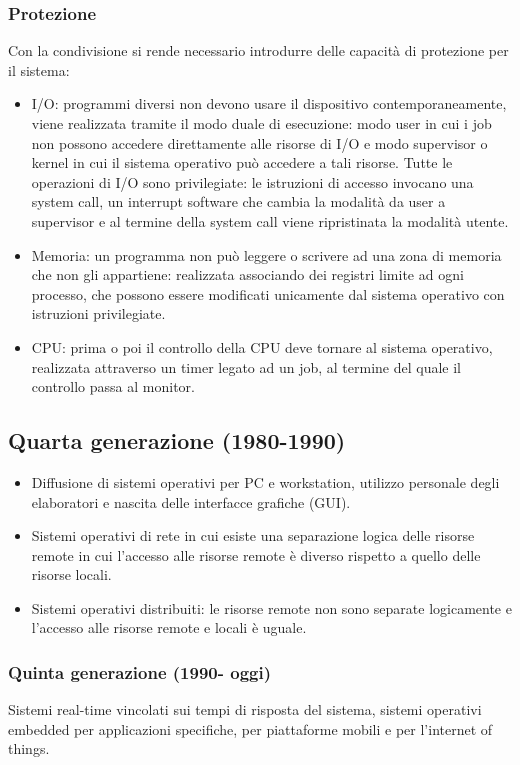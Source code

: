 \subsubsection{Protezione}
Con la condivisione si rende necessario introdurre delle capacit\`a di protezione per il sistema:
\begin{itemize}
	\item I/O: programmi diversi non devono usare il dispositivo contemporaneamente, viene realizzata tramite il modo duale di esecuzione: modo user in cui i
	      job non possono accedere direttamente alle risorse di I/O e modo supervisor o kernel in cui il sistema operativo pu\`o accedere a tali risorse. Tutte le
	      operazioni di I/O sono privilegiate: le istruzioni di accesso invocano una system call, un interrupt software che cambia la modalit\`a da user a supervisor
	      e al termine della system call viene ripristinata la modalit\`a utente.
	\item Memoria: un programma non pu\`o leggere o scrivere ad una zona di memoria che non gli appartiene: realizzata associando dei registri limite ad ogni
	      processo, che possono essere modificati unicamente dal sistema operativo con istruzioni privilegiate.
	\item CPU: prima o poi il controllo della CPU deve tornare al sistema operativo, realizzata attraverso un timer legato ad un job, al termine del quale il
	      controllo passa al monitor.
\end{itemize}
\subsection{Quarta generazione (1980-1990)}
\begin{itemize}
	\item Diffusione di sistemi operativi per PC e workstation, utilizzo personale degli elaboratori e nascita delle interfacce grafiche (GUI).
	\item Sistemi operativi di rete in cui esiste una separazione logica delle risorse remote in cui l'accesso alle risorse remote \`e diverso rispetto a quello
	      delle risorse locali.
	\item Sistemi operativi distribuiti: le risorse remote non sono separate logicamente e l'accesso alle risorse remote e locali \`e uguale.
\end{itemize}
\subsubsection{Quinta generazione (1990- oggi)}
Sistemi real-time vincolati sui tempi di risposta del sistema, sistemi operativi embedded per applicazioni specifiche, per piattaforme mobili e per
l'internet of things.

